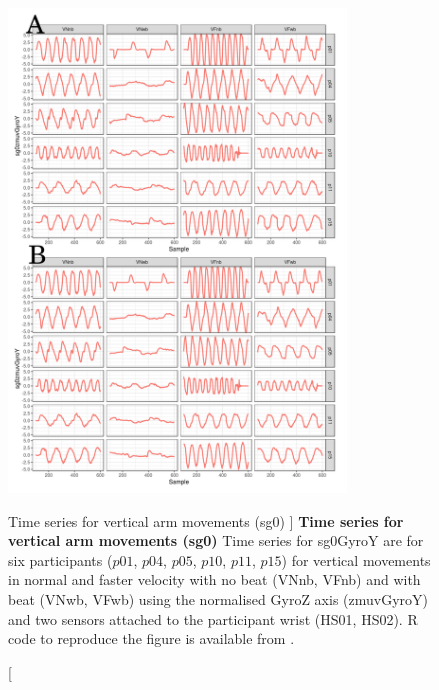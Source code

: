 \begin{figure}
\centering
\includegraphics[width=0.8\textwidth]{tssg0gyroY}
	\caption
	[Time series for vertical arm movements (sg0) ]{
	{\bf Time series for vertical arm movements (sg0)}
		Time series for sg0GyroY  are for six participants 
		($p01$, $p04$, $p05$, $p10$, $p11$, $p15$) 
		for vertical movements in normal and faster velocity with
		no beat	(VNnb, VFnb) and with beat (VNwb, VFwb) using 
		the normalised GyroZ axis (zmuvGyroY) and 
		two sensors attached to the participant wrist (HS01, HS02).
	R code to reproduce the figure is available from \cite{xochicale2018}.
	}
    \label{fig:tssg0gyroY-hii}
\end{figure}


